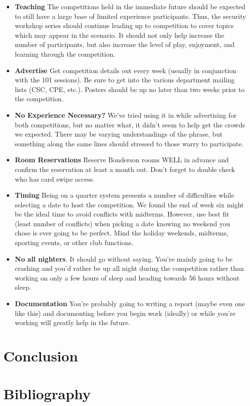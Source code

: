 \documentclass[10pt]{article}
\begin{document}
\begin{itemize}
    \item \textbf{Teaching} The competitions held in the immediate future should
    be expected to still have a large base of limited experience participants.
    Thus, the security workshop series should continue leading up to competition
    to cover topics which may appear in the scenario. It should not only help
    increase the number of participants, but also increase the level of play,
    enjoyment, and learning through the competition.
    \item \textbf{Advertise} Get competition details out every week (usually in
    conjunction with the 101 sessions). Be sure to get into the various
    department mailing lists (CSC, CPE, etc.). Posters should be up no later
    than two weeks prior to the competition.
    \item \textbf{No Experience Necessary?} We've tried using it in while
    advertising for both competitions, but no matter what, it didn't seem to
    help get the crowds we expected. There may be varying understandings of the
    phrase, but something along the same lines should stressed to those warry
    to participate.
    \item \textbf{Room Reservations} Reserve Bonderson rooms WELL in advance and
    confirm the reservation at least a month out. Don't forget to double check
    who has card swipe access.
    \item \textbf{Timing} Being on a quarter system presents a number of
    difficulties while selecting a date to host the competition. We found the end
    of week six might be the ideal time to avoid conflicts with midterms.
    However, use best fit (least number of conflicts) when picking a date
    knowing no weekend you chose is ever going to be perfect. Mind the holiday
    weekends, midterms, sporting events, or other club functions.
    \item \textbf{No all nighters}. It should go without saying. You're mainly
    going to be crashing and you'd rather be up all night during the
    competition rather than working on only a few hours of sleep and heading
    towards 56 hours without sleep.
    \item \textbf{Documentation} You're probably going to writing a report
    (maybe even one like this) and documenting before you begin work (ideally)
    or while you're working will greatly help in the future.
\end{itemize}

\section{Conclusion}

\newpage
\nocite{*}
\section{Bibliography}




\end{document}

